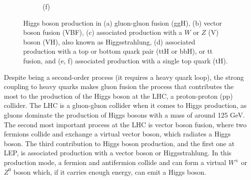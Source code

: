 \begin{figure}[!ht]
\begin{subfigure}[t]{0.33\mylength}
            \setlength{\unitlength}{0.25\mylength}
            \caption{\footnotesize (f)}
    \end{subfigure}%
    \vspace*{-0.0cm}
    \caption{Higgs boson production in (a) gluon-gluon fusion (ggH), (b) vector boson fusion (VBF), (c) associated production with a $W$ or $Z$ (V) boson (VH), also known as Higgsstrahlung, (d) associated production with a top or bottom quark pair (ttH or bbH), or tt fusion, and (e, f) associated production with a single top quark (tH).}
    \label{fig:Higgs_production}
    \vspace*{-0.0cm}
\end{figure}

Despite being a second-order process (it requires a heavy quark loop), the strong coupling to heavy quarks makes gluon fusion the process that contributes the most to the production of the Higgs boson at the LHC, a proton-proton (pp) collider. The LHC is a gluon-gluon collider when it comes to Higgs production, as gluons dominate the production of Higgs bosons with a mass of around 125 GeV. The second most important process at the LHC is vector boson fusion, where two fermions collide and exchange a virtual vector boson, which radiates a Higgs boson. The third contribution to Higgs boson production, and the first one at LEP, is associated production with a vector boson or Higgsstrahlung. In this production mode, a fermion and antifermion collide and can form a virtual $W^{\pm}$ or $Z^0$ boson which, if it carries enough energy, can emit a Higgs boson.


